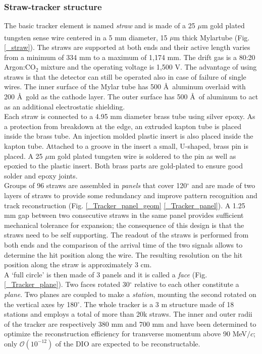 \documentclass[12pt,a4paper,openright, oneside, titlepage]{book} %
\begin{document}
\subsubsection{Straw-tracker structure}
The basic tracker element is named \textit{straw} and is made of a 25 $\mu$m gold plated tungsten sense wire centered in a 5 mm diameter, 15 $\mu$m thick Mylar\textsuperscript\textregistered  tube  (Fig. \ref{_straw}). 
The straws are supported at both ends and their active length varies from a minimum of 334 mm to a maximum of 1,174 mm.
The drift gas is a 80:20 Argon:CO$_2$ mixture and the operating voltage is 1,500 V. 
The advantage of using straws is that the detector can still be operated also in case of failure of single wires.
The inner surface of the Mylar tube has 500 \AA\ aluminum overlaid with 200 \AA\ gold as the cathode layer. 
The outer surface has 500 \AA\ of aluminum to act as an additional electrostatic shielding.\\
Each straw is connected to a 4.95 mm diameter brass tube using silver epoxy.
As a protection from breakdown at the edge, an extruded kapton tube is placed inside the brass tube. 
An injection molded plastic insert is also placed inside the kapton tube. 
Attached to a groove in the insert a small, U-shaped, brass pin is placed. 
A 25 $\mu$m gold plated tungsten wire is soldered to the pin as well as epoxied to the plastic insert. 
Both brass parts are gold-plated to ensure good solder and epoxy joints.  \\
Groups of 96 straws are assembled in \textit{panels} that cover 120$^\circ$ and are made of two layers of straws to provide some redundancy and improve pattern recognition and track reconstruction (Fig. \ref{_Tracker_panel_geom} \ref{_Tracker_panel}).
A 1.25 mm gap between two consecutive straws in the same panel provides sufficient mechanical tolerance for expansion; the consequence of this design is that the straws need to be self supporting. 
The readout of the straws is performed from both ends and the comparison of the arrival time of the two signals allows to determine the hit position along the wire. 
The resulting resolution on the hit position along the straw is approximately 3 cm. \\
A `full circle' is then made of 3 panels and it is called a \textit{face} (Fig. \ref{_Tracker_plane}). 
Two faces rotated  30$^\circ$ relative to each other constitute a \textit{plane}. 
Two planes are coupled to make a \textit{station}, mounting the second rotated on the vertical axes by 180$^\circ$. 
The whole tracker is a 3 m structure made of 18 stations  and employs a total of more than 20k straws. 
The inner and outer radii of the tracker are respectively 380 mm and 700 mm and have been determined to optimize the reconstruction efficiency for transverse momentum above 90 MeV$/c$; only $\mathcal{O}(10^{-12})$ of the DIO are expected to be reconstructable\cite{Manolis}. \\
\end{document}
